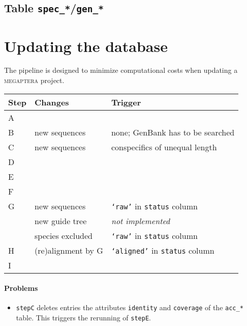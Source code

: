 \documentclass[12pt]{article}
\begin{document}
\subsection{Table \texttt{spec\_*}/\texttt{gen\_*}}

\begin{description}
\item[ ] 
\end{description}




\section{Updating the database}

The pipeline is designed to minimize computational costs when updating a \textsc{megaptera} project.
\vspace{\baselineskip}


\begin{tabular}{lll}
\hline
Step&Changes&Trigger\\
\hline
A&&\\
\hline
B&new sequences&none; GenBank has to be searched\\
\hline
C&new sequences&conspecifics of unequal length\\
\hline
D&&\\
\hline
E&&\\
\hline
F&&\\
\hline
G&new sequences&\texttt{`raw'} in \texttt{status} column\\
 &new guide tree&\emph{not implemented}\\
  &species excluded&\texttt{`raw'} in \texttt{status} column\\
\hline
H&(re)alignment by G&\texttt{`aligned'} in \texttt{status} column\\
\hline
I&&\\
\hline
\end{tabular}

\paragraph{Problems}
\begin{itemize}
\item \texttt{stepC} deletes entries the attributes \texttt{identity} and \texttt{coverage} of the \texttt{acc\_*} table. This triggers the rerunning of \texttt{stepE}.
\end{itemize}
\end{document}
